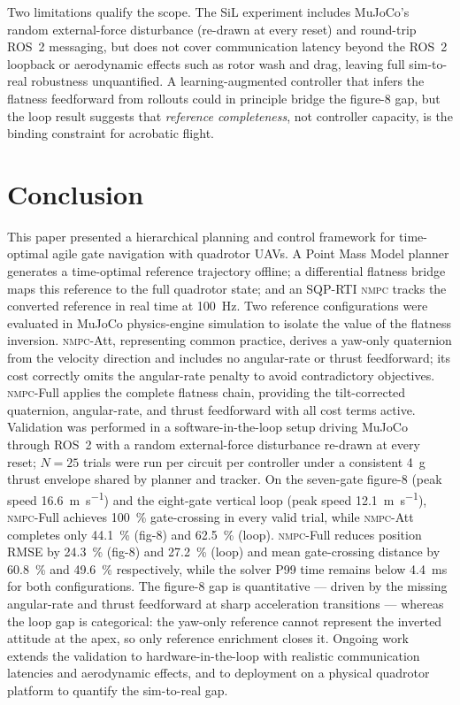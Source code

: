 \documentclass{ieeeaccess}
\newcommand{\nmpc}{\textsc{nmpc}}
\newcommand{\mujoco}{MuJoCo}
\begin{document}
Two limitations qualify the scope.
The SiL experiment includes \mujoco{}'s random external-force
disturbance (re-drawn at every reset) and round-trip ROS~2 messaging,
but does not cover communication latency beyond the ROS~2 loopback
or aerodynamic effects such as rotor wash and drag, leaving full
sim-to-real robustness unquantified.
A learning-augmented controller that infers the flatness
feedforward from rollouts could in principle bridge the figure-8
gap, but the loop result suggests that \emph{reference completeness},
not controller capacity, is the binding constraint for acrobatic
flight.

\section{Conclusion}
\label{sec:conclusion}

This paper presented a hierarchical planning and control
framework for time-optimal agile gate navigation with quadrotor UAVs.
A Point Mass Model planner generates a time-optimal reference trajectory
offline; a differential flatness bridge maps this reference to the full
quadrotor state; and an SQP-RTI \nmpc{} tracks the converted reference
in real time at \SI{100}{\hertz}.
Two reference configurations were evaluated in \mujoco{} physics-engine
simulation to isolate the value of the flatness inversion.
\nmpc{}-Att, representing common practice, derives a yaw-only quaternion
from the velocity direction and includes no angular-rate or thrust
feedforward; its cost correctly omits the angular-rate penalty to avoid
contradictory objectives.
\nmpc{}-Full applies the complete flatness chain, providing the
tilt-corrected quaternion, angular-rate, and thrust feedforward with all
cost terms active.
Validation was performed in a software-in-the-loop setup driving
\mujoco{} through ROS~2 with a random external-force disturbance
re-drawn at every reset; $N=25$ trials were run per circuit per
controller under a consistent \SI{4}{g} thrust envelope shared by
planner and tracker.
On the seven-gate figure-8 (peak speed \SI{16.6}{\metre\per\second})
and the eight-gate vertical loop (peak speed
\SI{12.1}{\metre\per\second}), \nmpc{}-Full achieves
\SI{100}{\percent} gate-crossing in every valid trial, while
\nmpc{}-Att completes only \SI{44.1}{\percent} (fig-8) and
\SI{62.5}{\percent} (loop).
\nmpc{}-Full reduces position RMSE by \SI{24.3}{\percent} (fig-8)
and \SI{27.2}{\percent} (loop) and mean gate-crossing distance by
\SI{60.8}{\percent} and \SI{49.6}{\percent} respectively, while the
solver P99 time remains below \SI{4.4}{\milli\second} for both
configurations.
The figure-8 gap is quantitative --- driven by the missing
angular-rate and thrust feedforward at sharp acceleration
transitions --- whereas the loop gap is categorical: the yaw-only
reference cannot represent the inverted attitude at the apex, so
only reference enrichment closes it.
Ongoing work extends the validation to hardware-in-the-loop with
realistic communication latencies and aerodynamic effects, and to
deployment on a physical quadrotor platform to quantify the
sim-to-real gap.
\end{document}
